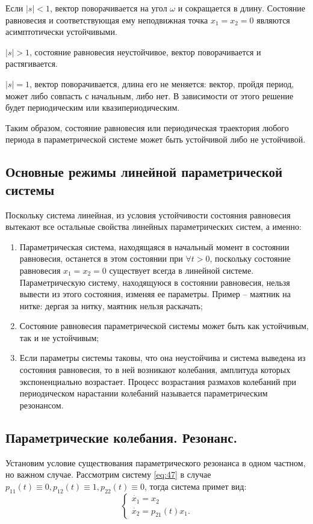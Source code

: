 Если $|s|<1$, вектор поворачивается на угол $\omega$ и сокращается в длину. Состояние равновесия и соответствующая ему неподвижная точка $x_1=x_2=0$ являются асимптотически устойчивыми.

$|s|>1$, состояние равновесия неустойчивое, вектор поворачивается и растягивается.

$|s|=1$, вектор поворачивается, длина его не меняется: вектор, пройдя период, может либо совпасть с начальным, либо нет. В зависимости от этого решение будет периодическим или квазипериодическим.

Таким образом, состояние равновесия или периодическая траектория любого периода в параметрической системе может быть устойчивой либо не устойчивой.

\subsection{Основные режимы линейной параметрической системы}

Поскольку система линейная, из условия устойчивости состояния равновесия вытекают все остальные свойства линейных параметрических систем, а именно:
\begin{enumerate} 
	\item Параметрическая система, находящаяся в начальный момент в состоянии равновесия, останется в этом состоянии при $\forall t>0$, поскольку состояние равновесия $x_1=x_2=0$ существует всегда в линейной системе. Параметрическую систему, находящуюся в состоянии равновесия, нельзя вывести из этого состояния, изменяя ее параметры. Пример -- маятник на нитке: дергая за нитку, маятник нельзя раскачать;
	\item Состояние равновесия параметрической системы может быть как устойчивым, так и не устойчивым;
	\item Если параметры системы таковы, что она неустойчива и система выведена из состояния равновесия, то в ней возникают колебания, амплитуда которых экспоненциально возрастает.  Процесс возрастания размахов колебаний при периодическом нарастании колебаний называется параметрическим резонансом.
\end{enumerate} 

\subsection{Параметрические колебания. Резонанс.}
Установим условие существования параметрического резонанса в одном частном, но важном случае. Рассмотрим систему \eqref{eq:47} в случае $p_{11}(t) \equiv0, p_{12}(t)\equiv 1, p_{22}(t) \equiv 0$, тогда система примет вид:
\begin{equation}
	\left\{\begin{aligned}
		\dot{x_1}=x_2 \\
		\dot{x_2}=p_{21}(t)x_1.
	\end{aligned}\right.
	\label{eq:76}
\end{equation}


